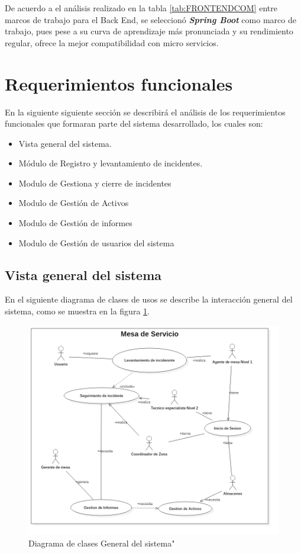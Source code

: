 De acuerdo a el análisis realizado en la tabla \ref{tab:FRONTENDCOM} entre marcos de trabajo para el Back End, se seleccionó \textbf{\textit{Spring Boot}} como marco de trabajo, pues pese a su curva de aprendizaje más pronunciada y su rendimiento regular, ofrece la mejor compatibilidad con micro servicios.
\newpage

\section{Requerimientos funcionales}


En la siguiente siguiente sección se describirá el análisis de los requerimientos funcionales que formaran parte del sistema desarrollado, los cuales son: 

\begin{itemize}
	\item Vista general del sistema. 
	\item Módulo de Registro y levantamiento de incidentes.
	\item Modulo de Gestiona y cierre de incidentes
	\item Modulo de Gestión de Activos
	\item Modulo de Gestión de informes
	\item Modulo de Gestión de usuarios del sistema
\end{itemize}



\newpage
\subsection{Vista general del sistema}
En el siguiente diagrama de clases de usos se describe la interacción general del sistema, como se muestra en la figura \ref{fig:DCUG}.

\begin{figure}[h]
	\centering
	\includegraphics[width=1.1\textwidth]{Capitulo4/Img/Mesa2}
	\caption{Diagrama de clases General del sistema"}
	\label{fig:DCUG}
\end{figure}



